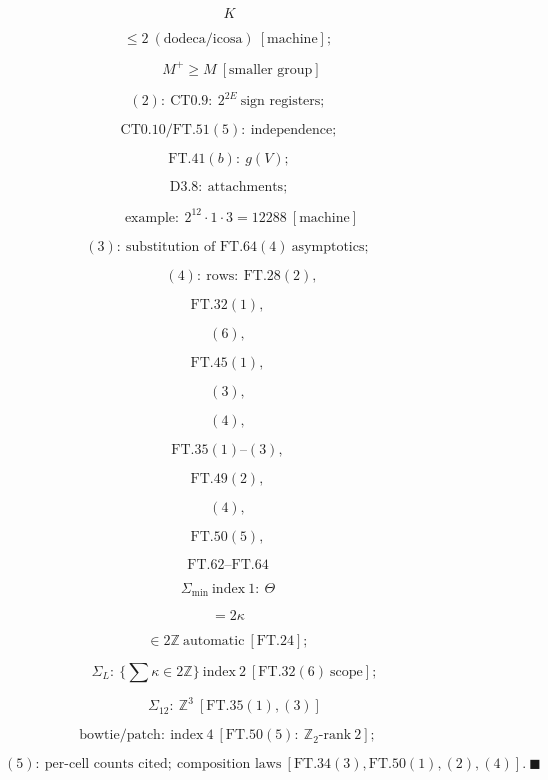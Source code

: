 \begin{theorem}
\[
\ K
\]

\[
\le 2\ (\text{dodeca/icosa})\ [\text{machine}];
\]

\[
\qquad M^+\ge M\ [\text{smaller group}]
\]

\[
(2):\ \mathrm{CT0.9}:\ 2^{2E}\ \text{sign registers};
\]

\[
\ \mathrm{CT0.10}/\mathrm{FT.51}(5):\ \text{independence};
\]

\[
\ \mathrm{FT.41}(b):\ g(V);
\]

\[
\ \mathrm{D3.8}:\ \text{attachments};
\]

\[
\qquad \text{example}:\ 2^{12}\cdot1\cdot3=12288\ [\text{machine}]
\]

\[
(3):\ \text{substitution of FT.64}(4)\ \text{asymptotics};
\]

\[
\qquad (4):\ \text{rows}:\ \mathrm{FT.28}(2),
\]

\[
\mathrm{FT.32}(1),
\]

\[
(6),
\]

\[
\mathrm{FT.45}(1),
\]

\[
(3),
\]

\[
(4),
\]

\[
\mathrm{FT.35}(1)\text{--}(3),
\]

\[
\mathrm{FT.49}(2),
\]

\[
(4),
\]

\[
\mathrm{FT.50}(5),
\]

\[
\mathrm{FT.62}\text{--}\mathrm{FT.64}
\]

\[
\Sigma_{\min}\ \text{index}\ 1:\ \Theta
\]

\[
= 2\kappa
\]

\[
\in 2\mathbb Z\ \text{automatic}\ [\mathrm{FT.24}];
\]

\[
\quad\Sigma_L:\ \{\textstyle\sum\kappa\in2\mathbb Z\}\ \text{index}\ 2\ [\mathrm{FT.32}(6)\ \text{scope}];
\]

\[
\quad\Sigma_{12}:\ \mathbb Z^3\ [\mathrm{FT.35}(1),(3)]
\]

\[
\text{bowtie/patch}:\ \text{index}\ 4\ [\mathrm{FT.50}(5):\ \mathbb Z_2\text{-rank}\ 2];
\]

\[
\qquad (5):\ \text{per-cell counts cited};\ \text{composition laws}\ [\mathrm{FT.34}(3),\mathrm{FT.50}(1),(2),(4)].\ \blacksquare
\]


\end{theorem}
